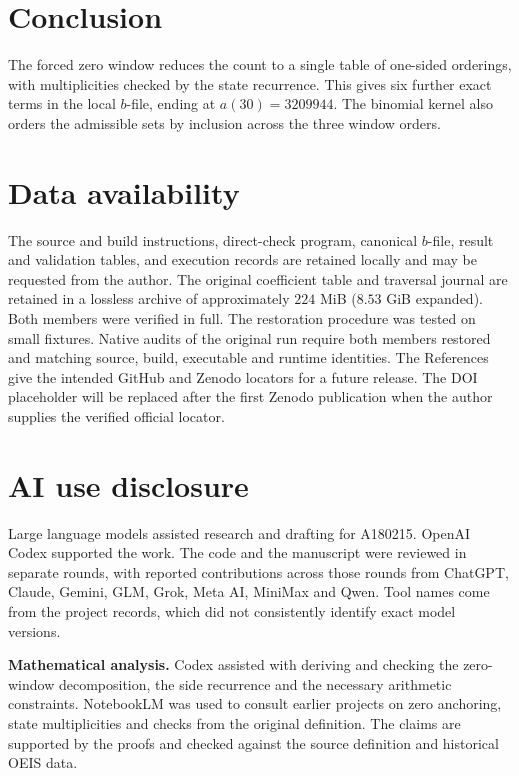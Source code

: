 \documentclass[11pt]{article}
\begin{document}
\section{Conclusion}

The forced zero window reduces the count to a single table of one-sided
orderings, with multiplicities checked by the state recurrence.
This gives six further exact terms in the local \(b\)-file, ending at
\(a(30)=3209944\). The binomial kernel also orders the admissible sets
by inclusion across the three window orders.

\section*{Data availability}

The source and build instructions, direct-check program, canonical
\(b\)-file, result and validation tables, and execution records are
retained locally and may be requested from the author. The original
coefficient table and traversal journal are retained in a lossless
archive of approximately \(224\) MiB (\(8.53\) GiB expanded).
Both members were verified in full. The restoration procedure was
tested on small fixtures. Native audits
of the original run require both members restored and matching
source, build, executable and runtime identities. The References give
the intended GitHub and Zenodo locators for a future release. The DOI
placeholder will be replaced after the first Zenodo publication when the
author supplies the verified official locator.

\section*{AI use disclosure}

Large language models assisted research and drafting for A180215.
OpenAI Codex supported the work. The code and the manuscript were
reviewed in separate rounds, with reported contributions across those
rounds from ChatGPT, Claude, Gemini, GLM, Grok, Meta AI, MiniMax and Qwen.
Tool names come from the project records, which did not consistently
identify exact model versions.

\smallskip
\noindent\textbf{Mathematical analysis.}
Codex assisted with deriving and checking the zero-window decomposition,
the side recurrence and the necessary arithmetic constraints.
NotebookLM was used to consult earlier projects on zero anchoring,
state multiplicities and checks from the original definition.
The claims are supported by the proofs and checked against the source
definition and historical OEIS data.
\end{document}
